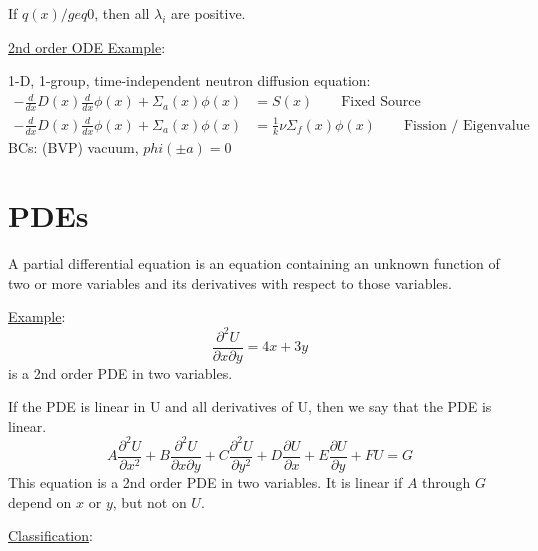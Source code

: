 \documentclass[12pt]{article}
\newcommand{\Macro}{\ensuremath{\Sigma}}
\begin{document}
If $q(x) /geq 0$, then all $\lambda_i$ are positive.

\vspace*{1em}
\noindent \underline{2nd order ODE Example}:

1-D, 1-group, time-independent neutron diffusion equation:
%
\begin{align}
-\frac{d}{dx}D(x)\frac{d}{dx}\phi(x) + \Macro_a(x)\phi(x) &= S(x) \qquad \text{Fixed Source} \nonumber \\
-\frac{d}{dx}D(x)\frac{d}{dx}\phi(x) + \Macro_a(x)\phi(x) &= \frac{1}{k} \nu \Macro_f(x) \phi(x)\qquad \text{Fission / Eigenvalue} \nonumber
\end{align}
%
BCs: (BVP) vacuum, $phi(\pm a) = 0$

\section{PDEs}

A partial differential equation is an equation containing an unknown function of two or more variables and its derivatives with respect to those variables. 

\vspace*{1em}
\noindent \underline{Example}:
%
\begin{equation}
\frac{\partial^2 U}{\partial x \partial  y} = 4x + 3y \nonumber
\end{equation}
%
is a 2nd order PDE in two variables. 

If the PDE is linear in U and all derivatives of U, then we say that the PDE is linear.
%
\begin{equation}
A\frac{\partial^2 U}{\partial x^2} + B\frac{\partial^2 U}{\partial x \partial  y} + C\frac{\partial^2 U}{\partial y^2} + D\frac{\partial U}{\partial x} + E\frac{\partial U}{\partial y} + FU = G \nonumber
\end{equation}
%
This equation is a 2nd order PDE in two variables. It is linear if $A$ through $G$ depend on $x$ or $y$, but not on $U$.

\vspace*{1em}
\noindent \underline{Classification}:
\end{document}

